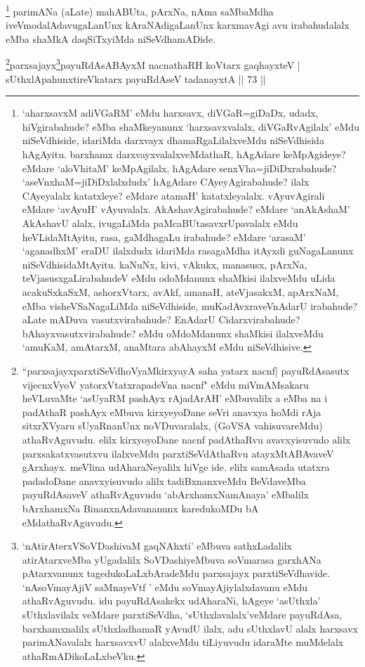 \begin{artha}
\footnote{`aharxsavxM adiVGaRM' eMdu harxsavx, diVGaR=giDaDx, udadx, hiVgirabahude? eMba shaMkeyanunx `harxsavxvalalx, diVGaRvAgilalx' eMdu niSeVdhiside, idariMda darxvayx dhamaRgaLilalxveMdu niSeVdhisida hAgAyitu. barxhamx darxvayxvalalxveMdathaR, hAgAdare keMpAgideye? eMdare `aloVhitaM' keMpAgilalx, hAgAdare senxVha=jiDiDxrabahude? `aseVnxhaM=jiDiDxlalxdudx' hAgAdare CAyeyAgirabahude? ilalx CAyeyalalx katatxleye? eMdare atamaH' katatxleyalalx. vAyuvAgirali eMdare `avAyuH' vAyuvalalx. AkAshavAgirabahude? eMdare `anAkAshaM' AkAshavU alalx, ivugaLiMda paMcaBUtasavxrUpavalalx eMdu heVLidaMtAyitu, rasa, gaMdhagaLu irabahude? eMdare `arasaM' `aganadhxM' eraDU ilalxdudx idariMda rasagaMdha itAyxdi guNagaLanunx niSeVdhisidaMtAyitu. kaNuNx, kivi, vAkukx, manasusx, pArxNa, teVjasusxgaLirabahudeV eMdu odoMdanunx shaMkisi ilalxveMdu uLida acakuSxkaSxM, ashorxVtarx, avAkf, amanaH, ateVjasakxM, apArxNaM, eMba visheVSaNagaLiMda niSeVdhiside, muKadAvxraveVnAdarU irabahude? aLate mADuva vasutxvirabahude? EnAdarU Cidarxvirabahude? bAhayxvasutxvirabahude? eMdu oMdoMdanunx shaMkisi ilalxveMdu `amuKaM, amAtarxM, anaMtara abAhayxM eMdu niSeVdhisive.} parimANa (aLate) mahABUta, pArxNa, nAma saMbaMdha iveV\break modalAdavugaLanUnx kAraNAdigaLanUnx karxmavAgi avu irabahudalalx eMba shaMkA daqSiTxyiMda niSeVdhamADide.
\end{artha}



 
\begin{shl}
\footnote{``parxsajayxparxtiSeVdhoV\s yaMkirxyayA saha yatarx nacnf| payuRdAsasutx vijecnxVyoV yatorxVtatxrapadeVna nacnf" eMdu miVmAMsakaru heVLuvaMte `asUyaRM pashAyx rAjadArAH' eMbuvalilx a eMba na i padAthaR pashAyx eMbuva kirxyeyoDane seVri anavxya hoMdi rAja sitxrXVyaru sUyaRnanUnx noVDuvaralalx, (GoVSA vahisuvareMdu) athaRvAguvudu. elilx kirxyoyoDane nacnf padAthaRvu avavxyisuvudo alilx parxsakatxvasutxvu ilalxveMdu parxtiSeVdAthaRvu atayxMtABAvaveV gArxhayx. meVlina udAharaNeyalilx hiVge ide. elilx samAsada utatxra padadoDane anavxyisuvudo alilx tadiBxnanxveMdu BeVdaveMba payuRdAsaveV athaRvAguvudu `abArxhamxNamAnaya' eMbalilx bArxhamxNa BinanxnAdavananunx karedukoMDu bA eMdathaRvAguvudu.}parxsajayx\footnote{`nAtirAterxVSoVDashivaM gaqNAhxti' eMbuva sathxLadalilx atirAtarxveMba yUgadalilx SoVDashiyeMbuva soVmarasa garxhANa pAtarxvanunx tagedukoLaLxbAradeMdu parxsajayx parxtiSeVdhavide. `nAsoVmayAjiV saMnayeVtf ' eMdu soVmayAjiylalxdavanu eMdu athaRvAguvudu. idu payuRdAsakekx udAharaNi, hAgeye `asUthxla' sUthxlavilalx veMdare parxtiSeVdha, `sUthxlavalalx'veMdare payuRdAsa, barxhamxnalilx sUthxladhamaR yAvudU ilalx, adu sUthxlavU alalx harxsavx parimANavalalx harxsavxvU alalxveMdu tiLiyuvudu idaraMte muMdelalx athaRmADikoLaLxbeVku.}payuRdAsABAyxM nacnathaRH koV\s tarx gaqhayxteV |\\
sUthxlApahunxtireVkatarx payuRdAseV tadanayxtA \hfill || 73 ||
\end{shl}

